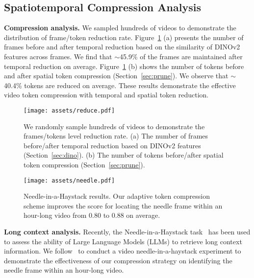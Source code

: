 \subsection{Spatiotemporal Compression Analysis}
\label{sec:compress}

\noindent\textbf{Compression analysis.} We sampled hundreds of videos to demonstrate the distribution of frame/token reduction rate. Figure~\ref{fig:reduce} (a) presents the number of frames before and after temporal reduction based on the similarity of DINOv2 features across frames. We find that $\sim$45.9\% of the frames are maintained after temporal reduction on average. Figure~\ref{fig:reduce} (b) shows the number of tokens before and after spatial token compression (Section~\ref{sec:prune}). We observe that $\sim$40.4\% tokens are reduced on average. These results demonstrate the effective video token compression with temporal and spatial token reduction. 

\begin{figure}[h]
    \centering
    \texttt{[image: assets/reduce.pdf]}
    \caption{We randomly sample hundreds of videos to demonstrate the frames/tokens level reduction rate. (a) The number of frames before/after temporal reduction based on DINOv2 features (Section~\ref{sec:dino}). (b) The number of tokens before/after spatial token compression (Section~\ref{sec:prune}).}
    \label{fig:reduce}
\end{figure}

\begin{figure}[h]
    \centering
    \texttt{[image: assets/needle.pdf]}
    \caption{Needle-in-a-Haystack results. Our adaptive token compression scheme improves the score for locating the needle frame within an hour-long video from 0.80 to 0.88 on average.}
    \label{fig:needle}
\end{figure}

\noindent\textbf{Long context analysis.} Recently, the Needle-in-a-Haystack task~\citep{hsieh2024ruler,kamradt2023needle} has been used to assess the ability of Large Language Models (LLMs) to retrieve long context information. We follow~\citep{zhang2024long} to conduct a video needle-in-a-haystack experiment to demonstrate the effectiveness of our compression strategy on identifying the needle frame within an hour-long video.

